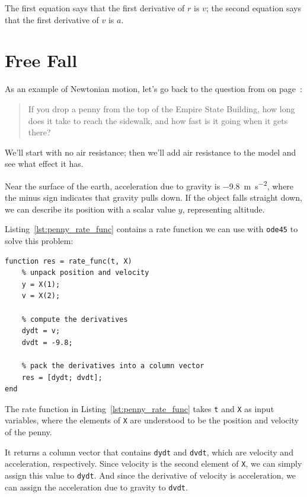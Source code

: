 The first equation says that the first derivative of $r$ is $v$;
the second equation says that the first derivative of $v$ is $a$.


\section{Free Fall}
\label{freefall}

As an example of Newtonian motion, let's go back to the question from  on page~\pageref{penny}:

\begin{quote}
If you drop a penny from the top of the Empire State Building, how long does it take to reach the sidewalk, and how fast is it going when it gets there?
\end{quote}

We'll start with no air resistance; then we'll add air resistance to the model and see what effect it has.


Near the surface of the earth,
acceleration due to gravity is \SI{-9.8}{\meter \per \second \squared}, where the minus sign
indicates that gravity pulls down.
If the object falls straight down, we can describe its position with a
scalar value $y$, representing altitude.

Listing~\ref{lst:penny_rate_func} contains a rate function we can use with \lstinline{ode45} to solve
this problem:

\begin{lstlisting}[caption={A rate function for the falling penny problem}, label={lst:penny_rate_func}]
function res = rate_func(t, X)
    % unpack position and velocity
    y = X(1);      
    v = X(2);      
    
    % compute the derivatives
    dydt = v;
    dvdt = -9.8;

    % pack the derivatives into a column vector
    res = [dydt; dvdt];
end
\end{lstlisting}

The rate function in Listing~\ref{lst:penny_rate_func} takes \lstinline{t} and \lstinline{X} as input variables, where the elements of \lstinline{X} are understood to be the position and velocity of the penny.

It returns a column vector that contains \lstinline{dydt} and \lstinline{dvdt}, which
are velocity and acceleration, respectively.
Since velocity is the second element of \lstinline{X}, we can simply assign this value to \lstinline{dydt}.
And since the derivative of velocity is acceleration, we can assign the acceleration due to gravity to \lstinline{dvdt}.

